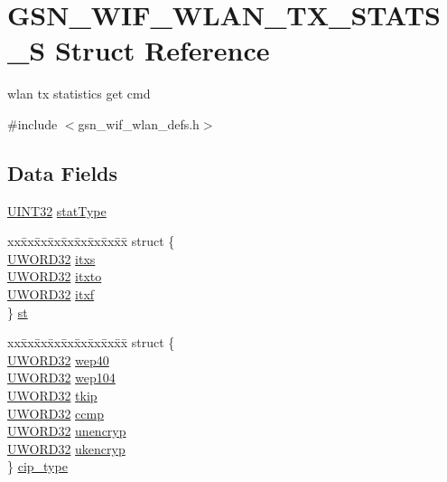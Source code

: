 \hypertarget{a00410}{
\section{GSN\_\-WIF\_\-WLAN\_\-TX\_\-STATS\_\-S Struct Reference}
\label{a00410}
}


wlan tx statistics get cmd  




{\ttfamily \#include $<$gsn\_\-wif\_\-wlan\_\-defs.h$>$}

\subsection*{Data Fields}
\begin{DoxyCompactItemize}
\item 
\hyperlink{a00660_gae1e6edbbc26d6fbc71a90190d0266018}{UINT32} \hyperlink{a00410_a1368e1d98f8be9ce5103d4d75a56588a}{statType}
\item 
\begin{tabbing}
xx\=xx\=xx\=xx\=xx\=xx\=xx\=xx\=xx\=\kill
struct \{\\
\>\hyperlink{a00677_gad0599cef3ddc489e9b2fe8afc3159f12}{UWORD32} \hyperlink{a00410_af37d80975c1e392ee6e0d7716dd25d1f}{itxs}\\
\>\hyperlink{a00677_gad0599cef3ddc489e9b2fe8afc3159f12}{UWORD32} \hyperlink{a00410_ab6f981da732b49662790618f0a6441f4}{itxto}\\
\>\hyperlink{a00677_gad0599cef3ddc489e9b2fe8afc3159f12}{UWORD32} \hyperlink{a00410_a2d2ab651bfccb98b887ad2229160e7fa}{itxf}\\
\} \hyperlink{a00410_a8f3bdd08f5f6770671203303462c8200}{st}\\

\end{tabbing}\item 
\begin{tabbing}
xx\=xx\=xx\=xx\=xx\=xx\=xx\=xx\=xx\=\kill
struct \{\\
\>\hyperlink{a00677_gad0599cef3ddc489e9b2fe8afc3159f12}{UWORD32} \hyperlink{a00410_af30857fde9d06828d91cff11936bee59}{wep40}\\
\>\hyperlink{a00677_gad0599cef3ddc489e9b2fe8afc3159f12}{UWORD32} \hyperlink{a00410_ab95f62b583a03134163d1f1fd4573a02}{wep104}\\
\>\hyperlink{a00677_gad0599cef3ddc489e9b2fe8afc3159f12}{UWORD32} \hyperlink{a00410_a098ddf70ebfebfbb42a1fcc820eb66a8}{tkip}\\
\>\hyperlink{a00677_gad0599cef3ddc489e9b2fe8afc3159f12}{UWORD32} \hyperlink{a00410_a1e6e626db840c729cdd71afad98acf4a}{ccmp}\\
\>\hyperlink{a00677_gad0599cef3ddc489e9b2fe8afc3159f12}{UWORD32} \hyperlink{a00410_a5cf4008170a4dba8a5299071161cef46}{unencryp}\\
\>\hyperlink{a00677_gad0599cef3ddc489e9b2fe8afc3159f12}{UWORD32} \hyperlink{a00410_af0e3049236e039064d544397e376c31b}{ukencryp}\\
\} \hyperlink{a00410_affb15a9835201e48b581f56a7912721c}{cip\_type}\\


\end{tabbing}
\end{DoxyCompactItemize}
